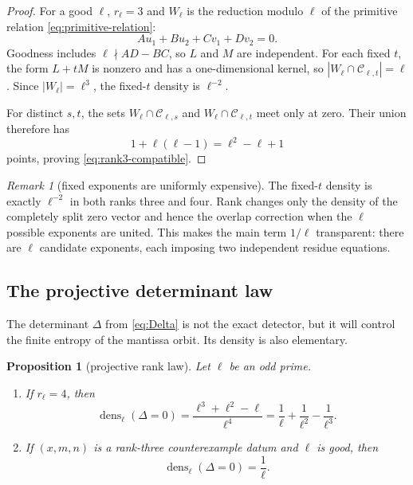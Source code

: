 \documentclass[11pt,oneside]{article}
\newtheorem{proposition}[theorem]{Proposition}
\theoremstyle{definition}
\theoremstyle{remark}
\newtheorem{remark}[theorem]{Remark}
\newcommand{\dens}{\operatorname{dens}}
\begin{document}
\begin{proof}
For a good $\ell$, $r_\ell=3$ and $W_\ell$ is the reduction modulo $\ell$ of
the primitive relation \eqref{eq:primitive-relation}:
\[
 Au_1+Bu_2+Cv_1+Dv_2=0.
\]
Goodness includes $\ell\nmid AD-BC$, so $L$ and $M$ are independent.  For
each fixed $t$, the form $L+tM$ is nonzero and has a one-dimensional kernel,
so $|W_\ell\cap\mathcal C_{\ell,t}|=\ell$.  Since
$|W_\ell|=\ell^3$, the fixed-$t$ density is $\ell^{-2}$.

For distinct $s,t$, the sets
$W_\ell\cap\mathcal C_{\ell,s}$ and
$W_\ell\cap\mathcal C_{\ell,t}$ meet only at zero.  Their union therefore
has
\[
 1+\ell(\ell-1)=\ell^2-\ell+1
\]
points, proving \eqref{eq:rank3-compatible}.
\end{proof}

\begin{remark}[fixed exponents are uniformly expensive]\label{rem:fixed-t}
The fixed-$t$ density is exactly $\ell^{-2}$ in both ranks three and four.
Rank changes only the density of the completely split zero vector and hence
the overlap correction when the $\ell$ possible exponents are united.
This makes the main term $1/\ell$ transparent: there are $\ell$ candidate
exponents, each imposing two independent residue equations.
\end{remark}

\subsection{The projective determinant law}

The determinant $\Delta$ from \eqref{eq:Delta} is not the exact detector, but
it will control the finite entropy of the mantissa orbit.  Its density is
also elementary.

\begin{proposition}[projective rank law]\label{prop:projective-law}
Let $\ell$ be an odd prime.
\begin{enumerate}
\item If $r_\ell=4$, then
\[
 \dens_\ell(\Delta=0)
 =\frac{\ell^3+\ell^2-\ell}{\ell^4}
 =\frac1\ell+\frac1{\ell^2}-\frac1{\ell^3}.
\]
\item If $(x,m,n)$ is a rank-three counterexample datum and $\ell$ is good,
then
\[
 \dens_\ell(\Delta=0)=\frac1\ell.
\]
\end{enumerate}
\end{proposition}
\end{document}
